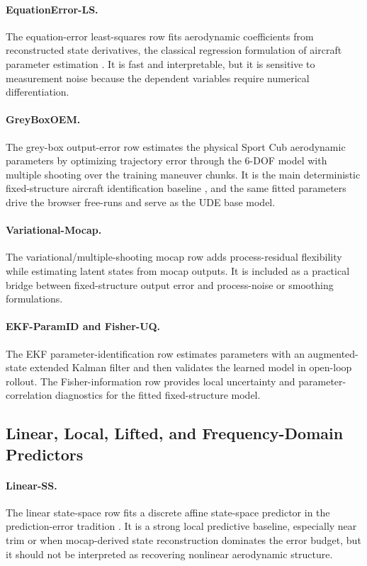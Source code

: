 \documentclass[11pt]{article}
\begin{document}
\paragraph{EquationError-LS.}
The equation-error least-squares row fits aerodynamic coefficients from reconstructed state derivatives, the classical regression formulation of aircraft parameter estimation \cite{KleinMorelli2006,morelli_system_2002}. It is fast and interpretable, but it is sensitive to measurement noise because the dependent variables require numerical differentiation.

\paragraph{GreyBoxOEM.}
The grey-box output-error row estimates the physical Sport Cub aerodynamic parameters by optimizing trajectory error through the 6-DOF model with multiple shooting over the training maneuver chunks. It is the main deterministic fixed-structure aircraft identification baseline \cite{jategaonkar2006flight,Morelli2002SIDPAC}, and the same fitted parameters drive the browser free-runs and serve as the UDE base model.

\paragraph{Variational-Mocap.}
The variational/multiple-shooting mocap row adds process-residual flexibility while estimating latent states from mocap outputs. It is included as a practical bridge between fixed-structure output error and process-noise or smoothing formulations.

\paragraph{EKF-ParamID and Fisher-UQ.}
The EKF parameter-identification row estimates parameters with an augmented-state extended Kalman filter \cite{kalman_new_1960,jategaonkar2006flight} and then validates the learned model in open-loop rollout. The Fisher-information row provides local uncertainty and parameter-correlation diagnostics for the fitted fixed-structure model.

\subsection{Linear, Local, Lifted, and Frequency-Domain Predictors}

\paragraph{Linear-SS.}
The linear state-space row fits a discrete affine state-space predictor in the prediction-error tradition \cite{ljung1999system}. It is a strong local predictive baseline, especially near trim or when mocap-derived state reconstruction dominates the error budget, but it should not be interpreted as recovering nonlinear aerodynamic structure.
\end{document}
